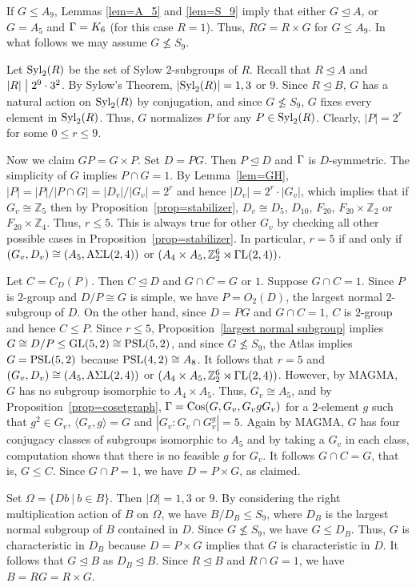 \documentclass[12pt]{article}
\def\di{\bigm|} \def\lg{\langle} \def\rg{\rangle}
\def\PSL{\hbox{\rm PSL}}\def\PSU{\hbox{\rm PSU}}
\def\Syl{\hbox{\rm Syl}}
\def\Cos{\hbox{\rm Cos}}
\newcommand{\qed}{\mbox{\raisebox{0.7ex}{\fbox{}}} \vspace{4truemm}}
\def\mz{{\mathbb Z}}
\begin{document}
If $G\leq A_9$, Lemmas \ref{lem=A_5} and \ref{lem=S_9} imply that either $G\unlhd A$, or $G=A_5$ and $\Gamma=K_6$ (for this case $R=1$). Thus, $RG=R\times G$ for $G\leq A_9$. In what follows we may assume $G\nleq S_9$.

Let $\Syl_2(R)$ be the set of Sylow $2$-subgroups of $R$. Recall that $R\unlhd A$ and $|R|\di 2^9\cdot 3^2$.
By Sylow's Theorem, $|\Syl_2(R)|=1,3$ or $9$. Since $R\unlhd B$, $G$ has a natural action on $\Syl_2(R)$ by conjugation, and since $G\nleq S_9$, $G$ fixes every element in $\Syl_2(R)$. Thus, $G$ normalizes $P$ for any $P\in \Syl_2(R)$. Clearly, $|P|=2^r$ for some $0\leq r\leq 9$.

Now we claim $GP=G\times P$. Set $D=PG$. Then $P\unlhd D$ and $\Gamma$ is $D$-symmetric. The simplicity of $G$ implies $P\cap G=1$. By Lemma~\ref{lem=GH}, $|P|=|P|/|P\cap G|=|D_v|/|G_v|=2^r$ and hence $|D_v|=2^r\cdot |G_v|$, which implies that if $G_v\cong \mz_5$ then by Proposition~\ref{prop=stabilizer}, $D_v\cong D_5$, $D_{10}$, $F_{20}$, $F_{20}\times \mz_2$ or $F_{20}\times \mz_4$. Thus, $r\leq 5$. This is always true for other $G_v$ by checking all other possible cases in  Proposition~\ref{prop=stabilizer}. In particular, $r=5$ if and only if $(G_v,D_v)\cong (A_5, {\rm A\Sigma L}(2,4))$ or
$(A_4\times A_5, \mathbb{Z}^6_2\rtimes  {\rm \Gamma L}(2,4))$.

Let $C=C_D(P)$. Then $C\unlhd D$ and $G\cap C=G$ or $1$. Suppose $G\cap C=1$. Since $P$ is $2$-group and $D/P\cong G$
is simple, we have $P=O_2(D)$, the largest normal $2$-subgroup of $D$. On the other hand, since $D=PG$ and $G\cap C=1$,
$C$ is $2$-group and hence $C\leq P$. Since $r\leq 5$, Proposition~\ref{largest normal subgroup} implies $G\cong D/P\leq \GL(5,2)\cong \PSL(5,2)$, and since $G\nleq S_9$, the Atlas \cite[p. 70]{Atlas} implies $G=\PSL(5,2)$ because $\PSL(4,2)\cong A_8$.
It follows that $r=5$ and $(G_v,D_v)\cong (A_5, {\rm A\Sigma L}(2,4))$ or $(A_4\times A_5, \mathbb{Z}^6_2\rtimes  {\rm \Gamma L}(2,4))$. However, by MAGMA, $G$ has no subgroup isomorphic to $A_4 \times A_5$. Thus, $G_v\cong A_5$, and by Proposition~\ref{prop=cosetgraph}, $\G=\Cos(G,G_v,G_vgG_v)$ for a $2$-element $g$ such that $g^2\in G_v$, $\langle G_v,g\rangle=G$ and $|G_v:G_v\cap G_v^g|=5$. Again by MAGMA, $G$ has four conjugacy classes of subgroups isomorphic to $A_5$ and by taking a $G_v$ in each class, computation shows that there is no feasible $g$ for $G_v$. It follows $G\cap C=G$, that is, $G\leq C$. Since $G\cap P=1$, we have $D=P\times G$, as claimed.

Set $\Omega=\{Db~|~b\in B\}$. Then $|\Omega|=1,3$ or $9$. By considering the right multiplication action of $B$ on $\Omega$,
we have $B/D_B \leq S_9$, where $D_B$ is the largest normal subgroup of $B$ contained in $D$. Since $G\nleq S_9$,
we have $G\leq D_B$. Thus, $G$ is characteristic in $D_B$ because $D=P\times G$ implies that $G$ is characteristic in $D$. It follows that $G\unlhd B$ as
$D_B\unlhd B$. Since $R\unlhd B$ and $R\cap G=1$, we have $B=RG=R \times G$.
\hfill\qed
\end{document}
